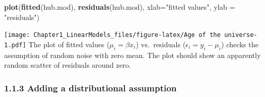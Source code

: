\documentclass[
]{article}
\newenvironment{Shaded}{\begin{snugshade}}{\end{snugshade}}
\newcommand{\DataTypeTok}[1]{\textcolor[rgb]{0.13,0.29,0.53}{#1}}
\newcommand{\KeywordTok}[1]{\textcolor[rgb]{0.13,0.29,0.53}{\textbf{#1}}}
\newcommand{\NormalTok}[1]{#1}
\newcommand{\StringTok}[1]{\textcolor[rgb]{0.31,0.60,0.02}{#1}}
\begin{document}
\begin{Shaded}
\begin{Highlighting}[]
\KeywordTok{plot}\NormalTok{(}\KeywordTok{fitted}\NormalTok{(hub.mod), }\KeywordTok{residuals}\NormalTok{(hub.mod), }\DataTypeTok{xlab=}\StringTok{"fitted values"}\NormalTok{, }\DataTypeTok{ylab =} \StringTok{"residuals"}\NormalTok{)}
\end{Highlighting}
\end{Shaded}

\texttt{[image: Chapter1\_LinearModels\_files/figure-latex/Age of the universe-1.pdf]}
The plot of fitted values (\(\mu_i = \beta x_i\)) vs.~residuals
(\(\epsilon_i = y_i - \mu_i\)) checks the assumption of random noise
with zero mean. The plot should show an apparently random scatter of
residuals around zero.

\hypertarget{adding-a-distributional-assumption}{%
\subsubsection{1.1.3 Adding a distributional
assumption}\label{adding-a-distributional-assumption}}
\end{document}
